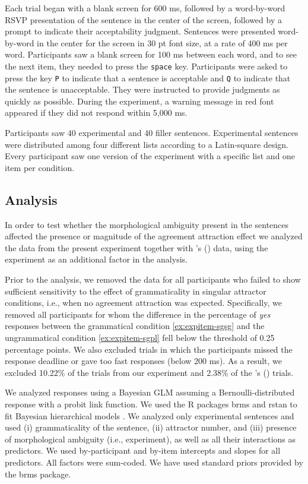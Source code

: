 \documentclass[brill,linguex]{glossa}\usepackage[]{graphicx}\usepackage[]{color}
\begin{document}
Each trial began with a blank screen for 600 ms, followed by a word-by-word RSVP presentation of the sentence in the center of the screen, followed by a prompt to indicate their acceptability judgment. Sentences were presented word-by-word in the center for the screen in 30 pt font size, at a rate of 400 ms per word. Participants saw a blank screen for 100 ms between each word, and to see the next item, they needed to press the \texttt{space} key. Participants were asked to press the key \texttt{P} to indicate that a sentence is acceptable and \texttt{Q} to indicate that the sentence is unacceptable. They were instructed to provide judgments as quickly as possible. During the experiment, a warning message in red font appeared if they did not respond within 5,000 ms.

Participants saw 40 experimental and 40 filler sentences. Experimental sentences were distributed among four different lists according to a Latin-square design. Every participant saw one version of the experiment with a specific list and one item per condition.

\subsection{Analysis}

In order to test whether the morphological ambiguity present in the \citet{LagoEtAl:2019} sentences affected the presence or magnitude of the agreement attraction effect we analyzed the data from the present experiment together with \citeauthor{LagoEtAl:2019}'s (\citeyear{LagoEtAl:2019}) data, using the experiment as an additional factor in the analysis.
  
Prior to the analysis, we removed the data for all participants who failed to show sufficient sensitivity to the effect of grammaticality in singular attractor conditions, i.e., when no agreement attraction was expected. Specifically, we removed all participants for whom the difference in the percentage of \textit{yes} responses between the grammatical condition \ref{ex:expitem-sgsg} and the ungrammatical condition \ref{ex:expitem-sgpl} fell below the threshold of 0.25 percentage points. We also excluded trials in which the participants missed the response deadline or gave too fast responses (below 200 ms). As a result, we excluded 10.22\% of the trials from our experiment and 2.38\% of the \citeauthor{LagoEtAl:2019}'s (\citeyear{LagoEtAl:2019}) trials. 

We analyzed responses using a Bayesian GLM assuming a Bernoulli-distributed response with a probit link function.  We used the R packages brms \citep{brms} and rstan \citep{rstan} to fit Bayesian hierarchical models \citep[e.g.,][]{GelmanHill:2007, NicenboimVasishth:2016}. We analyzed only experimental sentences and used (i) grammaticality of the sentence, (ii) attractor number, and (iii) presence of morphological ambiguity (i.e., experiment), as well as all their interactions as predictors. We used by-participant and by-item intercepts and slopes for all predictors. All factors were sum-coded. We have used standard priors provided by the brms package. 
\end{document}
